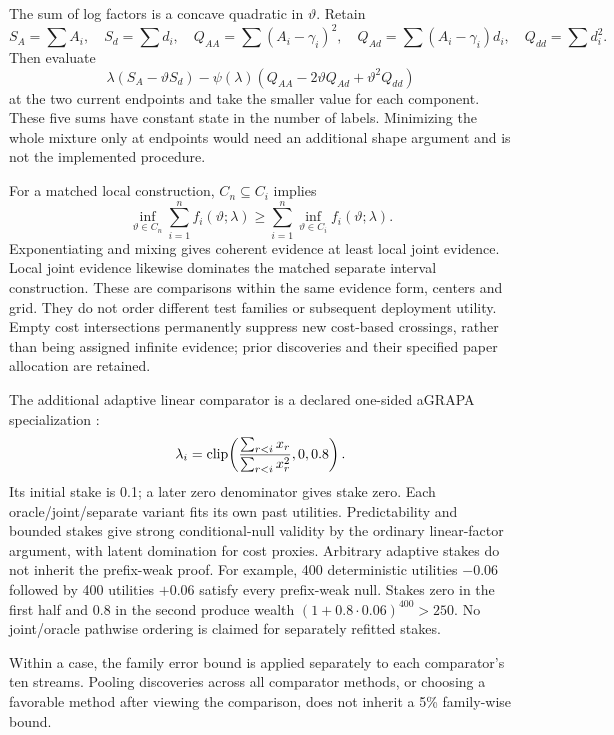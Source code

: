 The sum of log factors is a concave quadratic in $\vartheta$. Retain
\[
 S_A=\sum A_i,\quad S_d=\sum d_i,\quad
 Q_{AA}=\sum(A_i-\gamma_i)^2,\quad
 Q_{Ad}=\sum(A_i-\gamma_i)d_i,\quad Q_{dd}=\sum d_i^2.
\]
Then evaluate
\[
 \lambda(S_A-\vartheta S_d)
 -\psi(\lambda)(Q_{AA}-2\vartheta Q_{Ad}+\vartheta^2 Q_{dd})
\]
at the two current endpoints and take the smaller value for each component.
These five sums have constant state in the number of labels. Minimizing the
whole mixture only at endpoints would need an additional shape argument and
is not the implemented procedure.

For a matched local construction, $C_n\subseteq C_i$ implies
\[
 \inf_{\vartheta\in C_n}\sum_{i=1}^n f_i(\vartheta;\lambda)
 \geq\sum_{i=1}^n\inf_{\vartheta\in C_i}f_i(\vartheta;\lambda).
\]
Exponentiating and mixing gives coherent evidence at least local joint
evidence. Local joint evidence likewise dominates the matched separate
interval construction. These are comparisons within the same evidence form,
centers and grid. They do not order different test families or subsequent
deployment utility. Empty cost intersections permanently suppress new
cost-based crossings, rather than being assigned infinite evidence; prior
discoveries and their specified paper allocation are retained.

The additional adaptive linear comparator is a declared one-sided aGRAPA
specialization \citep[Appendix B.3]{waudby2024}:
\[
 \lambda_i=\operatorname{clip}\!\left(
       \frac{\sum_{r<i}x_r}{\sum_{r<i}x_r^2},0,0.8\right).
\]
Its initial stake is 0.1; a later zero denominator gives stake zero. Each
oracle/joint/separate variant fits its own past utilities. Predictability
and bounded stakes give strong conditional-null validity by the ordinary
linear-factor argument, with latent domination for cost proxies. Arbitrary
adaptive stakes do not inherit the prefix-weak proof. For example, 400
deterministic utilities $-0.06$ followed by 400 utilities $+0.06$ satisfy every
prefix-weak null. Stakes zero in the first half and 0.8 in the second produce
wealth $(1+0.8\cdot0.06)^{400}>250$. No joint/oracle pathwise ordering is
claimed for separately refitted stakes.

Within a case, the family error bound is applied separately to each
comparator's ten streams.
Pooling discoveries across all comparator methods, or choosing a favorable
method after viewing the comparison, does not inherit a 5\% family-wise bound.
